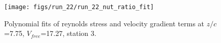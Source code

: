 \begin{figure}[H]
\centering
\texttt{[image: figs/run\_22/run\_22\_nut\_ratio\_fit]}
\caption{Polynomial fits of reynolds stress and velocity gradient terms at $z/c$=7.75, $V_{free}$=17.27, station 3.}
\label{fig:run_22_nut_ratio_fit}
\end{figure}


